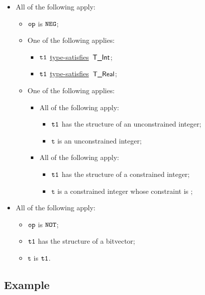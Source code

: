 \documentclass{book}
\newcommand\typesatisfies[0]{\hyperlink{def-typesatisfies}{type-satisfies}}
\newcommand\vt[0]{\texttt{t}}
\begin{document}
\begin{itemize}
  \item All of the following apply:
    \begin{itemize}
    \item $\texttt{op}$ is $\texttt{NEG}$;
    \item One of the following applies:
      \begin{itemize}
      \item $\texttt{t1}$ \typesatisfies\  $\textsf{T\_Int}$;
      \item $\texttt{t1}$ \typesatisfies\  $\textsf{T\_Real}$;
      \end{itemize}
     \item One of the following applies:
       \begin{itemize}
       \item All of the following apply:
         \begin{itemize}
         \item $\texttt{t1}$ has the structure of an unconstrained integer;
         \item $\vt$ is an unconstrained integer;
         \end{itemize}
       \item All of the following apply:
         \begin{itemize}
         \item $\texttt{t1}$ has the structure of a constrained integer;
         \item $\vt$ is a constrained integer whose constraint is ;
         \end{itemize}
       \end{itemize}
    \end{itemize}

  \item All of the following apply:
    \begin{itemize}
    \item $\texttt{op}$ is $\texttt{NOT}$;
    \item $\texttt{t1}$ has the structure of a bitvector;
    \item $\vt$ is $\texttt{t1}$.
    \end{itemize}
  \end{itemize}

\subsection{Example}

\end{document}
